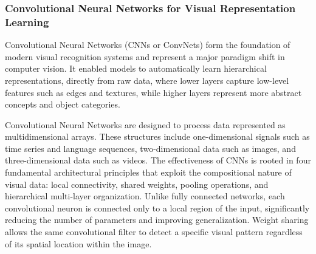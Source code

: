 \documentclass[12pt,a4paper]{report}
\begin{document}
\subsubsection{Convolutional Neural Networks for Visual Representation Learning}
Convolutional Neural Networks (CNNs or ConvNets) form the foundation of modern visual recognition systems and represent a major paradigm shift in computer vision. It enabled models to automatically learn hierarchical representations, directly from raw data, where lower layers capture low-level features such as edges and textures, while higher layers represent more abstract concepts and object categories.

Convolutional Neural Networks are designed to process data represented as multidimensional arrays. These structures include one-dimensional signals such as time series and language sequences, two-dimensional data such as images, and three-dimensional data such as videos. 
The effectiveness of CNNs is rooted in four fundamental architectural principles that exploit the compositional nature of visual data: local connectivity, shared weights, pooling operations, and hierarchical multi-layer organization. Unlike fully connected networks, each convolutional neuron is connected only to a local region of the input, significantly reducing the number of parameters and improving generalization. Weight sharing allows the same convolutional filter to detect a specific visual pattern regardless of its spatial location within the image.
\end{document}
